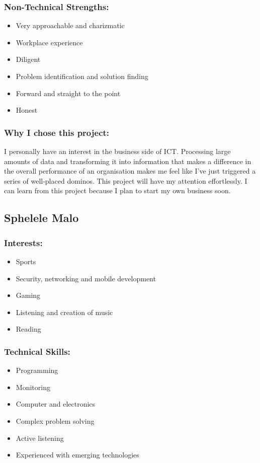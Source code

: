 \subsubsection{Non-Technical Strengths:}
\begin{itemize}
	\item Very approachable and charizmatic
	\item Workplace experience
	\item Diligent
	\item Problem identification and solution finding
	\item Forward and straight to the point
	\item Honest
\end{itemize}

\subsubsection{Why I chose this project:}
\par{I personally have an interest in the business side of ICT. Processing large amounts of data and transforming it into information that makes a difference in the overall performance of an organisation makes me feel like I've just triggered a series of well-placed dominos. This project will have my attention effortlessly. I can learn from this project because I plan to start my own business soon.}

\newpage
\subsection{Sphelele Malo}
\subsubsection{Interests:}
	\begin{itemize}
		\item Sports
		\item Security, networking and mobile development
		\item Gaming
		\item Listening and creation of music 
		\item Reading 
	\end{itemize}
\subsubsection{Technical Skills:}
	\begin{itemize}
		\item Programming
		\item Monitoring
		\item Computer and electronics 
		\item Complex problem solving
		\item Active listening
		\item Experienced with emerging technologies 
	\end{itemize}
	
